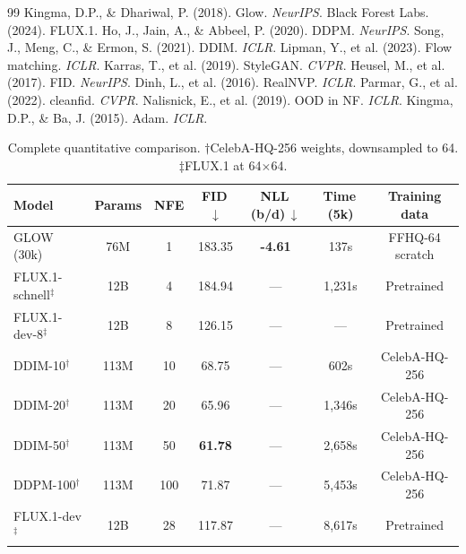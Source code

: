 \documentclass[10pt,twocolumn]{article}
\begin{document}
\small
\begin{thebibliography}{99}
Kingma, D.P., \& Dhariwal, P. (2018). Glow. \emph{NeurIPS}.
Black Forest Labs. (2024). FLUX.1.
Ho, J., Jain, A., \& Abbeel, P. (2020). DDPM. \emph{NeurIPS}.
Song, J., Meng, C., \& Ermon, S. (2021). DDIM. \emph{ICLR}.
Lipman, Y., et al. (2023). Flow matching. \emph{ICLR}.
Karras, T., et al. (2019). StyleGAN. \emph{CVPR}.
Heusel, M., et al. (2017). FID. \emph{NeurIPS}.
Dinh, L., et al. (2016). RealNVP. \emph{ICLR}.
Parmar, G., et al. (2022). cleanfid. \emph{CVPR}.
Nalisnick, E., et al. (2019). OOD in NF. \emph{ICLR}.
Kingma, D.P., \& Ba, J. (2015). Adam. \emph{ICLR}.
\end{thebibliography}

\clearpage
\onecolumn

\begin{table}[H]
\centering
\caption{Complete quantitative comparison. $\dagger$CelebA-HQ-256 weights, downsampled to 64. $\ddagger$FLUX.1 at 64$\times$64.}
\label{tab:main}
\small
\begin{tabular}{lcccccc}
\toprule
\textbf{Model} & \textbf{Params} & \textbf{NFE} & \textbf{FID\,$\downarrow$} & \textbf{NLL\,(b/d)\,$\downarrow$} & \textbf{Time\,(5k)} & \textbf{Training data}\\
\midrule
GLOW (30k)               & 76M  & 1   & 183.35 & \textbf{-4.61} & 137s    & FFHQ-64 scratch\\
FLUX.1-schnell$^\ddagger$ & 12B & 4   & 184.94 & ---            & 1,231s  & Pretrained\\
FLUX.1-dev-8$^\ddagger$   & 12B & 8   & 126.15 & ---            & ---     & Pretrained\\
DDIM-10$^\dagger$         & 113M & 10 & 68.75  & ---            & 602s    & CelebA-HQ-256\\
DDIM-20$^\dagger$         & 113M & 20 & 65.96  & ---            & 1,346s  & CelebA-HQ-256\\
DDIM-50$^\dagger$         & 113M & 50 & \textbf{61.78}  & ---   & 2,658s  & CelebA-HQ-256\\
DDPM-100$^\dagger$        & 113M & 100 & 71.87 & ---            & 5,453s  & CelebA-HQ-256\\
FLUX.1-dev$^\ddagger$     & 12B & 28  & 117.87 & ---            & 8,617s  & Pretrained\\
\bottomrule
\end{tabular}
\end{table}
\end{document}
